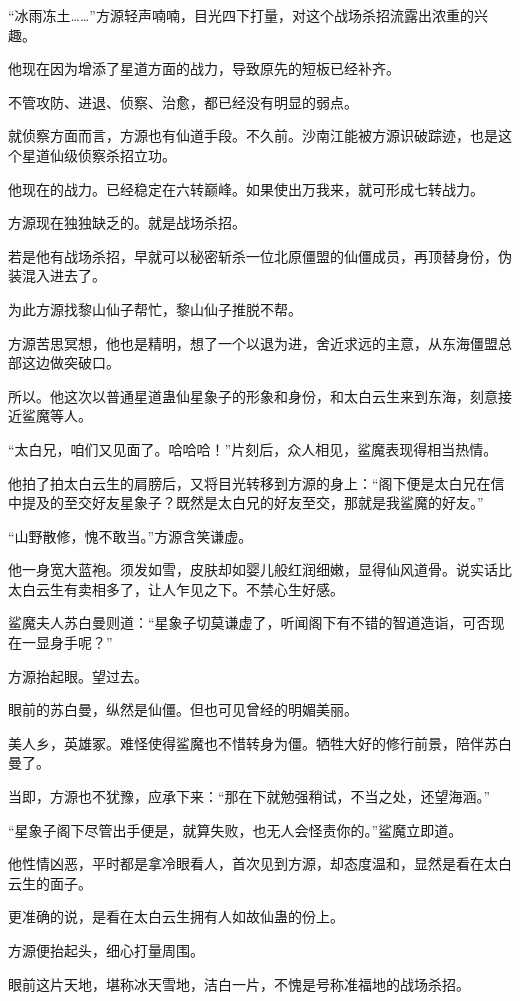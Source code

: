 \begin{this_body}
“冰雨冻土……”方源轻声喃喃，目光四下打量，对这个战场杀招流露出浓重的兴趣。

他现在因为增添了星道方面的战力，导致原先的短板已经补齐。

不管攻防、进退、侦察、治愈，都已经没有明显的弱点。

就侦察方面而言，方源也有仙道手段。不久前。沙南江能被方源识破踪迹，也是这个星道仙级侦察杀招立功。

他现在的战力。已经稳定在六转巅峰。如果使出万我来，就可形成七转战力。

方源现在独独缺乏的。就是战场杀招。

若是他有战场杀招，早就可以秘密斩杀一位北原僵盟的仙僵成员，再顶替身份，伪装混入进去了。

为此方源找黎山仙子帮忙，黎山仙子推脱不帮。

方源苦思冥想，他也是精明，想了一个以退为进，舍近求远的主意，从东海僵盟总部这边做突破口。

所以。他这次以普通星道蛊仙星象子的形象和身份，和太白云生来到东海，刻意接近鲨魔等人。

“太白兄，咱们又见面了。哈哈哈！”片刻后，众人相见，鲨魔表现得相当热情。

他拍了拍太白云生的肩膀后，又将目光转移到方源的身上：“阁下便是太白兄在信中提及的至交好友星象子？既然是太白兄的好友至交，那就是我鲨魔的好友。”

“山野散修，愧不敢当。”方源含笑谦虚。

他一身宽大蓝袍。须发如雪，皮肤却如婴儿般红润细嫩，显得仙风道骨。说实话比太白云生有卖相多了，让人乍见之下。不禁心生好感。

鲨魔夫人苏白曼则道：“星象子切莫谦虚了，听闻阁下有不错的智道造诣，可否现在一显身手呢？”

方源抬起眼。望过去。

眼前的苏白曼，纵然是仙僵。但也可见曾经的明媚美丽。

美人乡，英雄冢。难怪使得鲨魔也不惜转身为僵。牺牲大好的修行前景，陪伴苏白曼了。

当即，方源也不犹豫，应承下来：“那在下就勉强稍试，不当之处，还望海涵。”

“星象子阁下尽管出手便是，就算失败，也无人会怪责你的。”鲨魔立即道。

他性情凶恶，平时都是拿冷眼看人，首次见到方源，却态度温和，显然是看在太白云生的面子。

更准确的说，是看在太白云生拥有人如故仙蛊的份上。

方源便抬起头，细心打量周围。

眼前这片天地，堪称冰天雪地，洁白一片，不愧是号称准福地的战场杀招。


\end{this_body}
